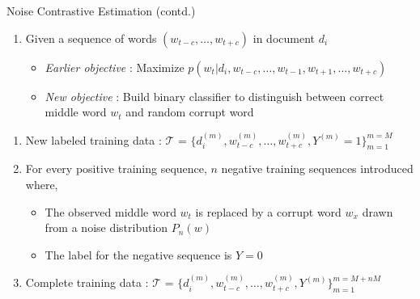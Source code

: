 \documentclass[10pt]{beamer}
\newcommand{\traindata}{\ensuremath{\mathcal{T}}}
\begin{document}
\begin{frame}{Noise Contrastive Estimation (contd.)}
\vfill
\begin{enumerate}
	\vfill\item<1-> Given a sequence of words $(w_{t-c}, \ldots, w_{t+c})$ in document $d_{i}$
	\begin{itemize}
		\vfill\item<2-> \emph{Earlier objective} : Maximize $p(w_{t} | d_{i}, w_{t-c}, \ldots, w_{t-1}, w_{t+1}, \ldots, w_{t+c})$	
		\vfill\item<3-> \emph{New objective}	 : Build binary classifier to distinguish between correct middle word $w_{t}$ and random corrupt word 	
	\end{itemize}
\end{enumerate}
\vfill {}
\begin{enumerate}
	\vfill\item<5-> New labeled training data : $\traindata$ = $\{d^{(m)}_{i}, w^{(m)}_{t-c}, \ldots, w^{(m)}_{t+c}, Y^{(m)}=1\}^{m=M}_{m=1}$
	\vfill\item<6-> For every positive training sequence, $n$ negative training sequences introduced where,
	\begin{itemize}
		\vfill\item<7-> The observed middle word $w_{t}$ is replaced by a corrupt word $w_{x}$ drawn from a noise distribution $P_{n}(w)$
		\vfill\item<8-> The label for the negative sequence is $Y = 0$
	\end{itemize}
	\vfill\item<9-> Complete training data : $\traindata$ = $\{d^{(m)}_{i}, w^{(m)}_{t-c}, \ldots, w^{(m)}_{t+c}, Y^{(m)}\}^{m=M+nM}_{m=1}$
\end{enumerate}

\end{frame}

\end{document}
